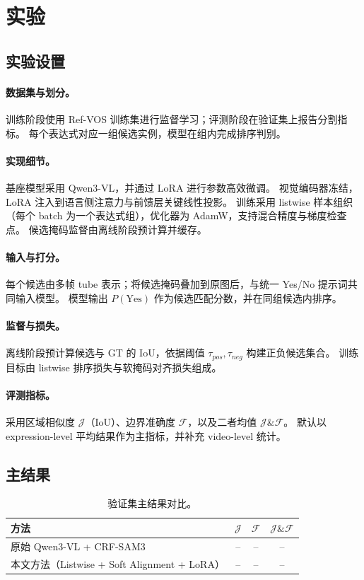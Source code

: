 \section{实验}

\subsection{实验设置}
\paragraph{数据集与划分。}
训练阶段使用 Ref-VOS 训练集进行监督学习；评测阶段在验证集上报告分割指标。
每个表达式对应一组候选实例，模型在组内完成排序判别。

\paragraph{实现细节。}
基座模型采用 Qwen3-VL，并通过 LoRA 进行参数高效微调。
视觉编码器冻结，LoRA 注入到语言侧注意力与前馈层关键线性投影。
训练采用 listwise 样本组织（每个 batch 为一个表达式组），优化器为 AdamW，支持混合精度与梯度检查点。
候选掩码监督由离线阶段预计算并缓存。

\paragraph{输入与打分。}
每个候选由多帧 tube 表示；将候选掩码叠加到原图后，与统一 Yes/No 提示词共同输入模型。
模型输出 $P(\text{Yes})$ 作为候选匹配分数，并在同组候选内排序。

\paragraph{监督与损失。}
离线阶段预计算候选与 GT 的 IoU，依据阈值 $\tau_{pos},\tau_{neg}$ 构建正负候选集合。
训练目标由 listwise 排序损失与软掩码对齐损失组成。

\paragraph{评测指标。}
采用区域相似度 $\mathcal{J}$（IoU）、边界准确度 $\mathcal{F}$，以及二者均值 $\mathcal{J}\&\mathcal{F}$。
默认以 expression-level 平均结果作为主指标，并补充 video-level 统计。

\subsection{主结果}
\begin{table}[t]
\centering
\caption{验证集主结果对比。}
\begin{tabular}{lccc}
\hline
方法 & $\mathcal{J}$ & $\mathcal{F}$ & $\mathcal{J}\&\mathcal{F}$ \\
\hline
原始 Qwen3-VL + CRF-SAM3 & -- & -- & -- \\
本文方法（Listwise + Soft Alignment + LoRA） & -- & -- & -- \\
\hline
\end{tabular}
\label{tab:main_cn}
\end{table}

